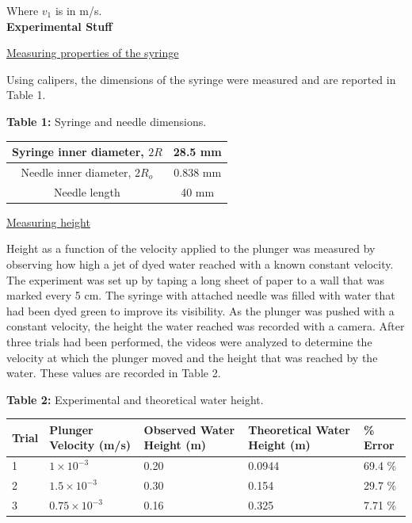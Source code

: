 \documentclass{article}
\begin{document}
Where $v_{1}$ is in m/s.
\\

\textbf{Experimental Stuff}

\underline{Measuring properties of the syringe}

Using calipers, the dimensions of the syringe were measured and are reported in Table 1.

\begin{center}\textbf{Table 1:} Syringe and needle dimensions. \end{center}
\begin{center}
\begin{tabular}{| c | c |}
\hline
Syringe inner diameter, $2R$ & 28.5 mm \\ 
\hline
Needle inner diameter, $2R_{o}$ & 0.838 mm \\  
\hline
Needle length & 40 mm \\  
\hline
\end{tabular}
\end{center}

\underline{Measuring height}

Height as a function of the velocity applied to the plunger was measured by observing how high a jet of dyed water reached with a known constant velocity.
The experiment was set up by taping a long sheet of paper to a wall that was marked every 5 cm.
The syringe with attached needle was filled with water that had been dyed green to improve its visibility.
As the plunger was pushed with a constant velocity, the height the water reached was recorded with a camera.
After three trials had been performed, the videos were analyzed to determine the velocity at which the plunger moved and the height that was reached by the water.
These values are recorded in Table 2.

\begin{center}\textbf{Table 2:} Experimental and theoretical water height. \end{center}
\begin{center}
\begin{tabular}{| p{1cm} | p{3.6cm} | p{3.6cm} | p{3.6cm} | p{2cm} |}
\hline
\textbf{Trial} & \textbf{Plunger Velocity (m/s)} & \textbf{Observed Water Height (m)} & \textbf{Theoretical Water Height (m)} & \textbf{\% Error} \\
\hline
1 & $1 \times 10^{-3}$ & 0.20 & 0.0944 & 69.4 \% \\
\hline
2 & $1.5 \times 10^{-3}$ & 0.30 & 0.154 & 29.7 \% \\  
\hline
3 & $0.75 \times 10^{-3}$ & 0.16 & 0.325 & 7.71 \% \\  
\hline
\end{tabular}
\end{center}
\end{document}
